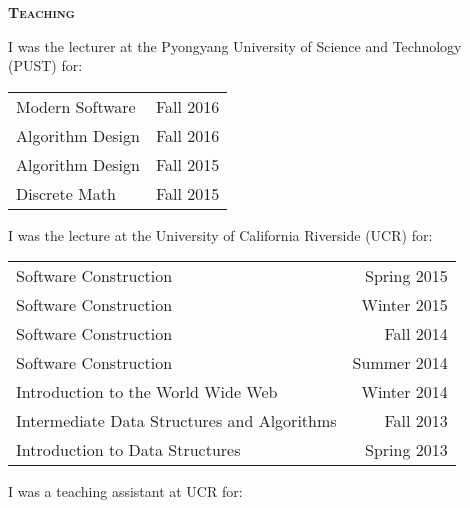 \documentclass[12pt]{article}
\begin{document}

\vspace{0.15in}
\noindent
{{\scshape \bfseries {Teaching}}}
\vspace{0.05in}


\noindent
I was the lecturer at the Pyongyang University of Science and Technology (PUST) for:

\noindent
\begin{tabularx}{\textwidth}{Xr}
Modern Software & Fall 2016 \\
Algorithm Design & Fall 2016 \\
Algorithm Design & Fall 2015 \\
Discrete Math & Fall 2015
\end{tabularx}

\vspace{0.1in}
\noindent
I was the lecture at the University of California Riverside (UCR) for:

\noindent
\begin{tabularx}{\textwidth}{Xr}
Software Construction & Spring 2015 \\
Software Construction & Winter 2015                        \\
Software Construction & Fall 2014 \\
Software Construction & Summer 2014 \\
Introduction to the World Wide Web & Winter 2014 \\
Intermediate Data Structures and Algorithms & Fall 2013 \\
Introduction to Data Structures & Spring 2013 \\
\end{tabularx}

\vspace{0.1in}
\noindent
I was a teaching assistant at UCR for:
\end{document}
